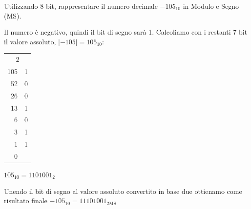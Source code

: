 \begin{Exercise}[label={ex:ms}]
    Utilizzando 8 bit, rappresentare il numero decimale $-105_{10}$ in Modulo e Segno (MS).
\end{Exercise}

\begin{Answer}[ref={ex:ms}]
    Il numero è negativo, quindi il bit di segno sarà 1.
    Calcoliamo con i restanti 7 bit il valore assoluto, $|-105| = 105_{10}$:
    
    \begin{center}
    \begin{tabular}{r|r}
        \multicolumn{2}{c}{2} \\
        105 & 1 \\
        52 & 0 \\
        26 & 0 \\
        13 & 1 \\
        6 & 0 \\
        3 & 1 \\
        1 & 1 \\
        0 &
    \end{tabular}
    \end{center}

    $105_{10} = 1101001_2$
    
    Unendo il bit di segno al valore assoluto convertito in base due ottienamo come risultato finale $-105_{10} = 11101001_{2\text{MS}}$
\end{Answer}
